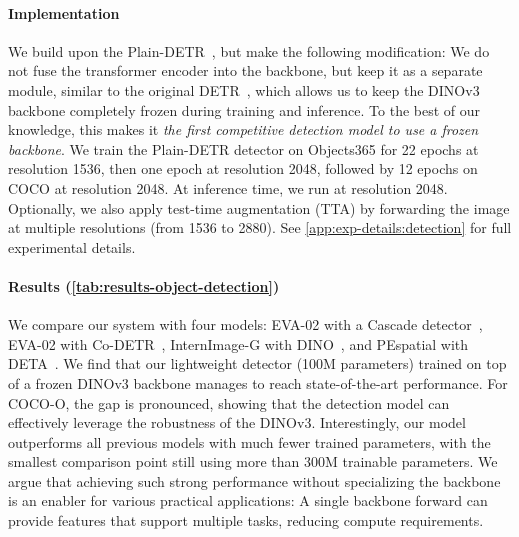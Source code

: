\paragraph{Implementation}
We build upon the Plain-DETR~\citep{lin2023plaindetr}, but make the following modification:
We do not fuse the transformer encoder into the backbone, but keep it as a separate module, similar to the original DETR~\citep{carion2020detr}, which allows us to keep the DINOv3 backbone completely frozen during training and inference.
To the best of our knowledge, this makes it \emph{the first competitive detection model to use a frozen backbone}.
We train the Plain-DETR detector on Objects365 for 22 epochs at resolution 1536, then one epoch at resolution 2048, followed by 12 epochs on COCO at resolution 2048.
At inference time, we run at resolution 2048.
Optionally, we also apply test-time augmentation (TTA) by forwarding the image at multiple resolutions (from 1536 to 2880).
See \cref{app:exp-details:detection} for full experimental details.

\paragraph[Results]{Results (\cref{tab:results-object-detection})}
We compare our system with four models: 
EVA-02 with a Cascade detector~\citep{fang2024eva},
EVA-02 with Co-DETR~\citep{zong2023detrs},
InternImage-G with DINO~\citep{wang2022internimage},
and PEspatial with DETA~\citep{bolya2025perception}.
We find that our lightweight detector (100M parameters) trained on top of a frozen DINOv3 backbone manages to reach state-of-the-art performance.
For COCO-O, the gap is pronounced, showing that the detection model can effectively leverage the robustness of the DINOv3.
Interestingly, our model outperforms all previous models with much fewer trained parameters, with the smallest comparison point still using more than 300M trainable parameters.
We argue that achieving such strong performance without specializing the backbone is an enabler for various practical applications: A single backbone forward can provide features that support multiple tasks, reducing compute requirements.

